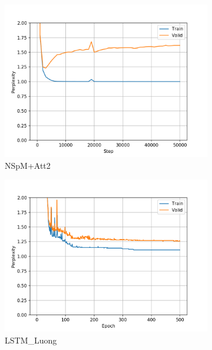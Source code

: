 \begin{figure}[H]
\begin{subfigure}{0.45\textwidth}
\includegraphics[width=\textwidth]{../results/monument2_2/run1/neural_sparql_machine_luong_attention/ppls.png} 
\caption{NSpM+Att2}
\label{fig:monu2 nsm-luo ppl}
\end{subfigure}
\hfill
\begin{subfigure}{0.45\textwidth}
\includegraphics[width=\textwidth]{../results/monument2_2/run1/lstm_luong_wmt_en_de/ppls.png}
\caption{LSTM\_Luong}
\label{fig:monu2 lstm ppl}
\end{subfigure}
\hfill
\begin{subfigure}{0.45\textwidth}

\end{subfigure}
\end{figure}
